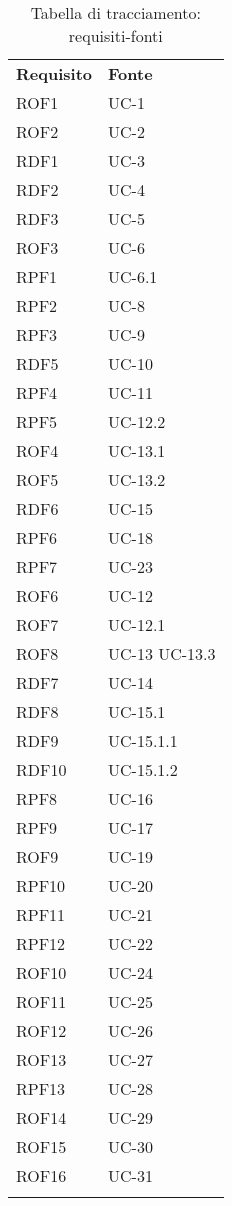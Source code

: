 \begin{longtable}{| p{5cm} | p{5cm} |}
		\rowcolor{LightBlue}
		\color{white}\bfseries Requisito & \color{white}\bfseries Fonte \\[0.25cm]
		\rowcolor{LightGray}
		ROF1 & UC-1 \\
		ROF2 & UC-2 \\
		\rowcolor{LightGray}
		RDF1 & UC-3 \\
		RDF2 & UC-4 \\
		\rowcolor{LightGray}
		RDF3 & UC-5 \\
		ROF3 & UC-6 \\
		\rowcolor{LightGray}
		RPF1 & UC-6.1 \\
		\rowcolor{LightGray}
		RPF2 & UC-8 \\
		RPF3 & UC-9 \\
		\rowcolor{LightGray}
		RDF5 & UC-10 \\
		RPF4 & UC-11 \\
		\rowcolor{LightGray}
		RPF5 &UC-12.2 \\
		ROF4 & UC-13.1 \\
		\rowcolor{LightGray}
		ROF5 & UC-13.2 \\
		RDF6 & UC-15 \\
		\rowcolor{LightGray}
		RPF6 & UC-18 \\
		RPF7 & UC-23 \\
		\rowcolor{LightGray}
		ROF6 & UC-12 \\
		ROF7 & UC-12.1 \\
		\rowcolor{LightGray}
		ROF8 & UC-13 \newline UC-13.3 \\
		RDF7 & UC-14\\
		\rowcolor{LightGray}
		RDF8 & UC-15.1\\
		RDF9 & UC-15.1.1\\
		\rowcolor{LightGray}
		RDF10 & UC-15.1.2\\
		RPF8 & UC-16\\
		\rowcolor{LightGray}
		RPF9 & UC-17\\
		ROF9 & UC-19 \\
		\rowcolor{LightGray}
		RPF10 & UC-20\\
		RPF11 & UC-21 \\
		\rowcolor{LightGray}
		RPF12 & UC-22 \\
		ROF10 & UC-24 \\
		\rowcolor{LightGray}
		ROF11 & UC-25 \\
		ROF12 & UC-26 \\
		\rowcolor{LightGray}
		ROF13 & UC-27 \\
		RPF13 & UC-28 \\
		\rowcolor{LightGray}
		ROF14 & UC-29 \\
		ROF15 & UC-30 \\
		\rowcolor{LightGray}
		ROF16 & UC-31 \\
		\hline
		\caption{Tabella di tracciamento: requisiti-fonti}
\end{longtable}

